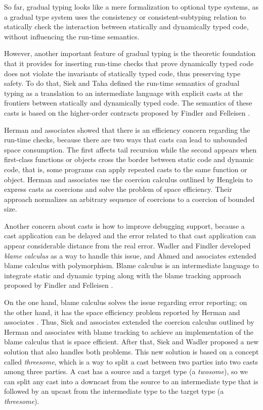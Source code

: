 So far, gradual typing looks like a mere formalization to optional
type systems, as a gradual type system uses the consistency or
consistent-subtyping relation to statically check the interaction
between statically and dynamically typed code, without influencing
the run-time semantics.

However, another important feature of gradual typing is the theoretic
foundation that it provides for inserting run-time checks that
prove dynamically typed code does not violate the invariants of
statically typed code, thus preserving type safety.
To do that, Siek and Taha \cite{siek2006gradual,siek2007objects}
defined the run-time semantics of gradual typing as a translation to an
intermediate language with explicit casts at the frontiers between
statically and dynamically typed code.
The semantics of these casts is based on the higher-order contracts
proposed by Findler and Felleisen \cite{findler2002chf}.

Herman and associates \cite{herman2007sgt} showed that there is an
efficiency concern regarding the run-time checks, because there are
two ways that casts can lead to unbounded space consumption.
The first affects tail recursion while the second appears when
first-class functions or objects cross the border between
static code and dynamic code, that is, some programs can apply
repeated casts to the same function or object.
Herman and associates \cite{herman2007sgt} use the coercion calculus
outlined by Henglein \cite{henglein1994dts} to express casts
as coercions and solve the problem of space efficiency.
Their approach normalizes an arbitrary sequence of coercions to a
coercion of bounded size.

Another concern about casts is how to improve debugging support,
because a cast application can be delayed and the error related
to that cast application can appear considerable distance
from the real error.
Wadler and Findler \cite{wadler2009wpc} developed \emph{blame calculus}
as a way to handle this issue, and Ahmed and associates \cite{ahmed2011bfa}
extended blame calculus with polymorphism.
Blame calculus is an intermediate language to integrate
static and dynamic typing along with the blame tracking approach
proposed by Findler and Felleisen \cite{findler2002chf}.

On the one hand, blame calculus solves the issue regarding
error reporting;
on the other hand, it has the space efficiency problem reported
by Herman and associates \cite{herman2007sgt}.
Thus, Siek and associates \cite{siek2009casts} extended the coercion
calculus outlined by Herman and associates \cite{herman2007sgt} with
blame tracking to achieve an implementation of the blame calculus that
is space efficient.
After that, Siek and Wadler \cite{siek2010blame} proposed a new solution
that also handles both problems.
This new solution is based on a concept called \emph{threesome},
which is a way to split a cast between two parties into two casts
among three parties.
A cast has a source and a target type (a \emph{twosome}),
so we can split any cast into a downcast from the source to an
intermediate type that is followed by an upcast from the intermediate
type to the target type (a \emph{threesome}).

